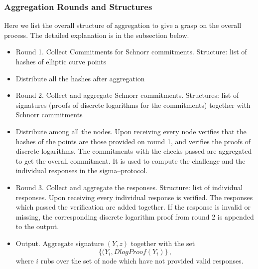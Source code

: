 \subsubsection{Aggregation Rounds and Structures}
Here we list the overall structure of aggregation to give a grasp on the overall process. The detailed explanation is in
the subsection below.
\begin{itemize}
    \item Round 1. Collect Commitments for Schnorr commitments.  Structure: list of hashes of elliptic curve points
    \item Distribute all the hashes after aggregation
    \item Round 2. Collect and aggregate Schnorr commitments. Structures: list of signatures (proofs of discrete
        logarithms for the commitments) together with Schnorr commitments
    \item Distribute among all the nodes. Upon receiving every node verifies that the hashes of the points are those
        provided on round 1, and verifies the proofs of discrete logarithms. The commitments with the checks passed are
        aggregated to get the overall commitment. It is used to compute the challenge and the individual responses in
        the sigma--protocol.
    \item Round 3. Collect and aggregate the responses. Structure: list of individual responses. Upon receiving every
        individual response is verified. The responses which passed the verification are added together. If the response
        is invalid or missing, the corresponding discrete logarithm proof from round 2 is appended to the output.
    \item Output. Aggregate signature $(Y,z)$ together with the set
        \[
            \{(Y_i, DlogProof(Y_i)\}\,,
        \]
        where $i$ rubs over the set of node which have not provided valid responses.
\end{itemize}

